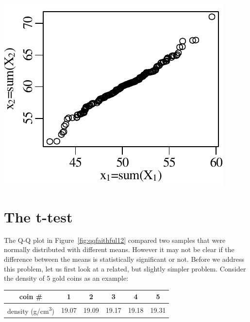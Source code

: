 \noindent\begin{minipage}[t][][b]{.3\textwidth}
  \includegraphics[width=\textwidth]{../figures/qqfaithful12.pdf}\\
\end{minipage}
\begin{minipage}[t][][t]{.7\textwidth}
  \label{fig:qqfaithful12}
\end{minipage}

\section{The t-test}
\label{sec:t}

The Q-Q plot in Figure~\ref{fig:qqfaithful12} compared two samples
that were normally distributed with different means.  However it may
not be clear if the difference between the means is statistically
significant or not. Before we address this problem, let us first look
at a related, but slightly simpler problem. Consider the density of 5
gold coins as an example:

\begin{center}
\begin{tabular}{c|ccccc}
  coin \# & 1 & 2 & 3 & 4 & 5 \\ \hline
  density (g/cm\textsuperscript{3}) & 19.07 & 19.09 & 19.17 & 19.18 & 19.31
  \label{tab:coins}
\end{tabular}
\end{center}

